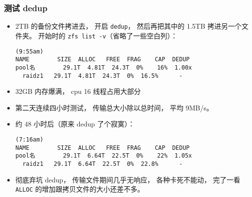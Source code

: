 \subsubsection{测试 dedup}
\begin{itemize}
\item 2TB 的备份文件拷进去， 开启 \verb|dedup|， 然后再把其中的 1.5TB 拷进另一个文件夹。 开始时的 \verb|zfs list -v|（省略了一些空白列）：
\begin{lstlisting}[language=none]
(9:55am)
NAME        SIZE  ALLOC   FREE  FRAG    CAP  DEDUP
pool名        29.1T  4.81T  24.3T  0%    16%  1.00x
  raidz1   29.1T  4.81T  24.3T  0%  16.5%      -
\end{lstlisting}
\item 32GB 内存爆满， cpu 16 线程占用大部分
\item 第二天连续四小时测试， 传输总大小除以总时间， 平均 9MB/s。
\item 约 48 小时后（原来 dedup 了个寂寞）：
\begin{lstlisting}[language=none]
(7:16am)
NAME        SIZE  ALLOC   FREE  FRAG    CAP  DEDUP 
pool名        29.1T  6.64T  22.5T  0%    22%  1.05x   
  raidz1   29.1T  6.64T  22.5T  0%  22.8%      - 
\end{lstlisting}
\item 彻底弃坑 dedup， 传输文件期间几乎无响应， 各种卡死不能动， 完了一看 \verb|ALLOC| 的增加跟拷贝文件的大小还差不多。
\end{itemize}
